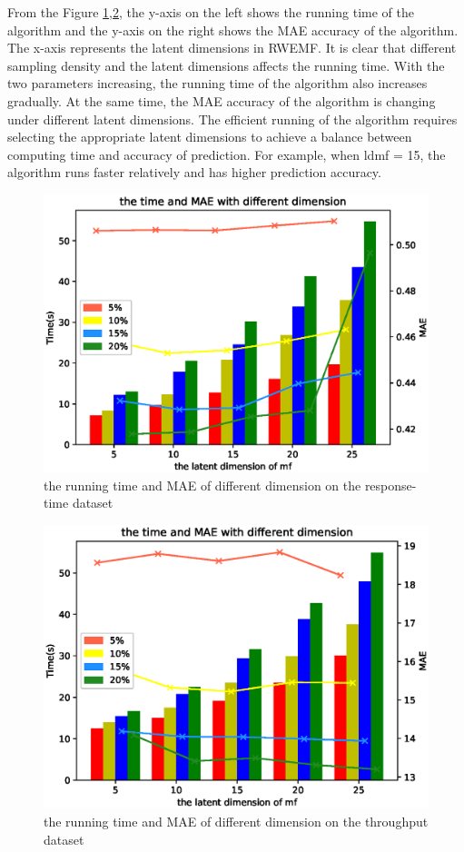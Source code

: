 \documentclass[conference]{IEEEtran}
\begin{document}
\par From the Figure \ref{fig_timae_rt},\ref{fig_timae_tp}, the y-axis on the left shows the running time of the algorithm and the y-axis on the right shows the MAE accuracy of the algorithm. The x-axis represents the latent dimensions in RWEMF. It is clear that different sampling density and the latent dimensions affects the running time. With the two parameters increasing, the running time of the algorithm also increases gradually. At the same time, the MAE accuracy of the algorithm is changing under different latent dimensions. The efficient running of the algorithm requires selecting the appropriate latent dimensions to achieve a balance between computing time and accuracy of prediction. For example, when ldmf = 15, the algorithm runs faster relatively and has higher prediction accuracy.

\begin{figure}[H] 
\centering  
\includegraphics[width=0.45\paperwidth]{timae_rt.eps}  
\caption{the running time and MAE of different dimension on the response-time dataset }  
\label{fig_timae_rt}  
\end{figure} 

\begin{figure}[H] 
\centering  
\includegraphics[width=0.45\paperwidth]{timae_tp.eps}  
\caption{the running time and MAE of different dimension on the throughput dataset }
\label{fig_timae_tp}  
\end{figure} 
\end{document}
